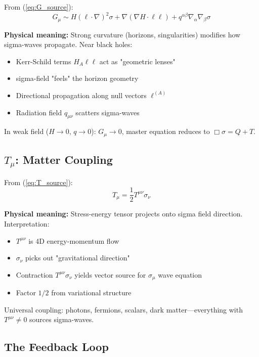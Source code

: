 \documentclass[11pt,a4paper]{article}
\theoremstyle{definition}
\theoremstyle{remark}
\begin{document}
		From (\ref{eq:G_source}):
		\begin{equation}
			G_\mu \sim H(\ell \cdot \nabla)^2\sigma + \nabla(\nabla H \cdot \ell\ell) + q^{\alpha\beta}\nabla_\alpha\nabla_\beta\sigma
		\end{equation}
		
		\textbf{Physical meaning:} Strong curvature (horizons, singularities) modifies how sigma-waves propagate. Near black holes:
		\begin{itemize}
			\item Kerr-Schild terms $H_A\ell\ell$ act as "geometric lenses"
			\item sigma-field "feels" the horizon geometry
			\item Directional propagation along null vectors $\ell^{(A)}$
			\item Radiation field $q_{\mu\nu}$ scatters sigma-waves
		\end{itemize}
		
		In weak field ($H \to 0$, $q \to 0$): $G_\mu \to 0$, master equation reduces to $\Box\sigma = Q + T$.
		
		\subsection{$T_\mu$: Matter Coupling}
		
		From (\ref{eq:T_source}):
		\begin{equation}
			T_\mu = \frac{1}{2}T^{\mu\nu}\sigma_\nu
		\end{equation}
		
		\textbf{Physical meaning:} Stress-energy tensor projects onto sigma field direction. Interpretation:
		\begin{itemize}
			\item $T^{\mu\nu}$ is 4D energy-momentum flow
			\item $\sigma_\nu$ picks out "gravitational direction"
			\item Contraction $T^{\mu\nu}\sigma_\nu$ yields vector source for $\sigma_\mu$ wave equation
			\item Factor $1/2$ from variational structure
		\end{itemize}
		
		Universal coupling: photons, fermions, scalars, dark matter—everything with $T^{\mu\nu} \neq 0$ sources sigma-waves.
		
		\subsection{The Feedback Loop}
		
\end{document}
